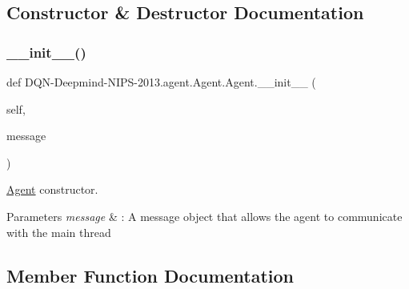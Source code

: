 \subsection{Constructor \& Destructor Documentation}
\hypertarget{classDQN-Deepmind-NIPS-2013_1_1agent_1_1Agent_1_1Agent_a3902963eaecb4b9dbe9bd0c06c2f9f01}{}\label{classDQN-Deepmind-NIPS-2013_1_1agent_1_1Agent_1_1Agent_a3902963eaecb4b9dbe9bd0c06c2f9f01} 
\subsubsection{\texorpdfstring{\+\_\+\+\_\+init\+\_\+\+\_\+()}{\_\_init\_\_()}}
{\footnotesize\ttfamily def D\+QN-\/Deepmind-\/N\+I\+PS-\/2013.agent.\+Agent.\+Agent.\+\_\+\+\_\+init\+\_\+\+\_\+ (\begin{DoxyParamCaption}\item[{}]{self,  }\item[{}]{message }\end{DoxyParamCaption})}



\hyperlink{classDQN-Deepmind-NIPS-2013_1_1agent_1_1Agent_1_1Agent}{Agent} constructor. 


\begin{DoxyParams}{Parameters}
{\em message} & \+: A message object that allows the agent to communicate with the main thread \\
\hline
\end{DoxyParams}


\subsection{Member Function Documentation}
\hypertarget{classDQN-Deepmind-NIPS-2013_1_1agent_1_1Agent_1_1Agent_a6cb1d914ca2954f968d2512f4dac3a36}{}\label{classDQN-Deepmind-NIPS-2013_1_1agent_1_1Agent_1_1Agent_a6cb1d914ca2954f968d2512f4dac3a36} 
